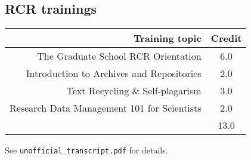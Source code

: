\subsection{RCR trainings}

\begin{frame}[noframenumbering]{}
    \begin{table}[htb!]
        \centering
        \begin{tabular}{r|c}
            Training topic & Credit \\
            \hline
            The Graduate School RCR Orientation & 6.0 \\
            Introduction to Archives and Repositories & 2.0 \\
            Text Recycling \& Self-plagarism & 3.0 \\
            Research Data Management 101 for Scientists & 2.0 \\
            \hline
             & 13.0
        \end{tabular}
    \end{table}

    \bigskip
    
    \begin{exampleblock}{}
        See \texttt{unofficial\_transcript.pdf} for details.
    \end{exampleblock}
\end{frame}
